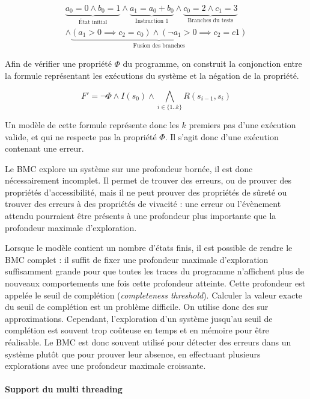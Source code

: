 \begin{multline}
  \underbrace{a_0 = 0 \land b_0 = 1}_\text{État initial} \land
  \underbrace{a_1 = a_0 + b_0}_\text{Instruction 1} \land
  \underbrace{c_0 = 2 \land c_1 = 3}_\text{Branches du tests} \\
  \land
  \underbrace{(a_1 > 0 \implies c_2 = c_0)
    \land (\lnot a_1 > 0 \implies c_2 = c1)
  }_\text{Fusion des branches}
\end{multline}


Afin de vérifier une propriété \(\Phi\) du programme, on construit la
conjonction entre la formule représentant les exécutions du système et la
négation de la propriété.

\[
F' = \lnot \Phi \land I(s_0) \land \bigwedge_{i\in \{1..k\}} R(s_{i-1}, s_i)
\]

Un modèle de cette formule représente donc les \(k\) premiers pas d'une
exécution valide, et qui ne respecte pas la propriété \(\Phi\). Il s'agit donc
d'une exécution contenant une erreur.

Le \ac{BMC} explore un système sur une profondeur bornée, il est donc nécessairement
incomplet. Il permet de trouver des erreurs, ou de prouver des propriétés
d'accessibilité, mais il ne peut prouver des propriétés de sûreté ou trouver des
erreurs à des propriétés de vivacité : une erreur ou l'évènement attendu
pourraient être présents à une profondeur plus importante que la profondeur
maximale d'exploration.

Lorsque le modèle contient un nombre d'états finis, il est possible de rendre le
\ac{BMC} complet : il suffit de fixer une profondeur maximale d'exploration
suffisamment grande pour que toutes les traces du programme n'affichent plus de
nouveaux comportements une fois cette profondeur atteinte. Cette profondeur est appelée le seuil de
complétion (\emph{completeness threshold}). Calculer la valeur exacte du seuil de
complétion est un problème difficile. On utilise donc des sur approximations.
Cependant, l'exploration d'un système jusqu'au seuil de complétion est souvent
trop coûteuse en temps et en mémoire pour être réalisable. Le \ac{BMC} est donc
souvent utilisé pour détecter des erreurs dans un système plutôt que pour
prouver leur absence, en effectuant plusieurs explorations avec une profondeur
maximale croissante.

\paragraph{Support du multi threading}


